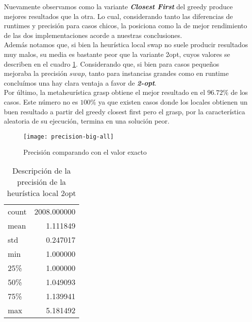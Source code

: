 Nuevamente observamos como la variante \textbf{\emph{Closest First}} del greedy produce mejores resultados que la otra. Lo cual, considerando tanto las diferencias de runtimes y precisión para casos chicos, la posiciona como la de mejor rendimiento de las dos implementaciones acorde a nuestras conclusiones.
\\

Además notamos que, si bien la heurística local swap no suele producir resultados muy malos,
su media es bastante peor que la variante 2opt, cuyos valores se describen en el cuadro \ref{tab:precision-big-local-2opt}. Considerando que, si bien para casos pequeños mejoraba la precisión $swap$, tanto para instancias grandes como en runtime concluímos una hay clara ventaja a favor de \textbf{\emph{2-opt}}.
\\

Por último, la metaheurística grasp obtiene el mejor resultado en el $96.72\%$ de los casos.
Este número no es $100\%$ ya que existen casos donde los locales obtienen un buen resultado a partir del greedy closest first pero el grasp, por la característica aleatoria de su ejecución, termina en una solución peor.

\begin{figure}[H]
    \centering
    \texttt{[image: precision-big-all]}
    \caption{Precisión comparando con el valor exacto}
    \label{fig:precision-big-all}
\end{figure}



\begin{table}[H]
    \begin{center}
        \begin{tabular}{ l | r }
            count  & 2008.000000 \\
            mean   &    1.111849 \\
            std    &    0.247017 \\
            min    &    1.000000 \\
            25\%   &    1.000000 \\
            50\%   &    1.049093 \\
            75\%   &    1.139941 \\
            max    &    5.181492 \\
        \end{tabular}
        \caption{Descripción de la precisión de la heurística local 2opt}\label{tab:precision-big-local-2opt}
    \end{center}
\end{table}

